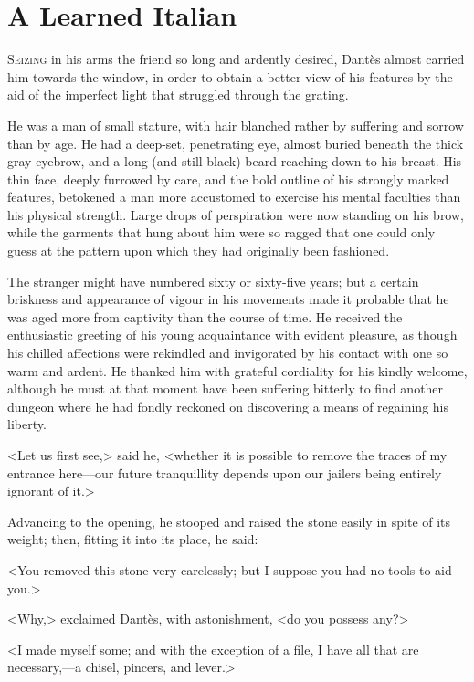 \chapter{A Learned Italian} 

 \lettrine{S}{eizing} in his arms the friend so long and ardently desired, Dantès almost carried him towards the window, in order to obtain a better view of his features by the aid of the imperfect light that struggled through the grating. 

 He was a man of small stature, with hair blanched rather by suffering and sorrow than by age. He had a deep-set, penetrating eye, almost buried beneath the thick gray eyebrow, and a long (and still black) beard reaching down to his breast. His thin face, deeply furrowed by care, and the bold outline of his strongly marked features, betokened a man more accustomed to exercise his mental faculties than his physical strength. Large drops of perspiration were now standing on his brow, while the garments that hung about him were so ragged that one could only guess at the pattern upon which they had originally been fashioned. 

 The stranger might have numbered sixty or sixty-five years; but a certain briskness and appearance of vigour in his movements made it probable that he was aged more from captivity than the course of time. He received the enthusiastic greeting of his young acquaintance with evident pleasure, as though his chilled affections were rekindled and invigorated by his contact with one so warm and ardent. He thanked him with grateful cordiality for his kindly welcome, although he must at that moment have been suffering bitterly to find another dungeon where he had fondly reckoned on discovering a means of regaining his liberty. 

 <Let us first see,> said he, <whether it is possible to remove the traces of my entrance here—our future tranquillity depends upon our jailers being entirely ignorant of it.> 

 Advancing to the opening, he stooped and raised the stone easily in spite of its weight; then, fitting it into its place, he said: 

 <You removed this stone very carelessly; but I suppose you had no tools to aid you.> 

 <Why,> exclaimed Dantès, with astonishment, <do you possess any?> 

 <I made myself some; and with the exception of a file, I have all that are necessary,—a chisel, pincers, and lever.>

